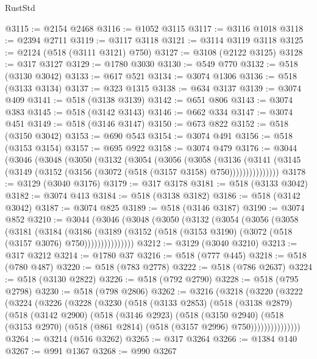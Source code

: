 \begin{lexlean}{RustStd}
\begin{coremodule}
@3115 := @2154 @2468
@3116 := @1052 @3115
@3117 := @3116 @1018
@3118 := @2394 @2711
@3119 := @3117 @3118
@3121 := @3114 @3119 @3118
@3125 := @2124 (@518 (@3111 @3121) @750)
@3127 := @3108 (@2122 @3125)
@3128 := @317 @3127
@3129 := @1780 @3030
@3130 := @549 @770
@3132 := @518 (@3130 @3042)
@3133 := @617 @521
@3134 := @3074 @1306
@3136 := @518 (@3133 @3134)
@3137 := @323 @1315
@3138 := @634 @3137
@3139 := @3074 @409
@3141 := @518 (@3138 @3139)
@3142 := @651 @806
@3143 := @3074 @383
@3145 := @518 (@3142 @3143)
@3146 := @662 @334
@3147 := @3074 @451
@3149 := @518 (@3146 @3147)
@3150 := @673 @822
@3152 := @518 (@3150 @3042)
@3153 := @690 @543
@3154 := @3074 @491
@3156 := @518 (@3153 @3154)
@3157 := @695 @922
@3158 := @3074 @479
@3176 := @3044
    (@3046
      (@3048
        (@3050
          (@3132
            (@3054
              (@3056
                (@3058
                  (@3136
                    (@3141
                      (@3145 (@3149 (@3152 (@3156 (@3072 (@518 (@3157 @3158) @750)))))))))))))))
@3178 := @3129 (@3040 @3176)
@3179 := @317 @3178
@3181 := @518 (@3133 @3042)
@3182 := @3074 @413
@3184 := @518 (@3138 @3182)
@3186 := @518 (@3142 @3042)
@3187 := @3074 @825
@3189 := @518 (@3146 @3187)
@3190 := @3074 @852
@3210 := @3044
    (@3046
      (@3048
        (@3050
          (@3132
            (@3054
              (@3056
                (@3058
                  (@3181
                    (@3184
                      (@3186
                        (@3189
                          (@3152 (@518 (@3153 @3190) (@3072 (@518 (@3157 @3076) @750)))))))))))))))
@3212 := @3129 (@3040 @3210)
@3213 := @317 @3212
@3214 := @1780 @37
@3216 := @518 (@777 @445)
@3218 := @518 (@780 @487)
@3220 := @518 (@783 @2778)
@3222 := @518 (@786 @2637)
@3224 := @518 (@3130 @2822)
@3226 := @518 (@792 @2790)
@3228 := @518 (@795 @2798)
@3230 := @518 (@798 @2806)
@3262 := @3216
    (@3218
      (@3220
        (@3222
          (@3224
            (@3226
              (@3228
                (@3230
                  (@518
                    (@3133 @2853)
                    (@518
                      (@3138 @2879)
                      (@518
                        (@3142 @2900)
                        (@518
                          (@3146 @2923)
                          (@518
                            (@3150 @2940)
                            (@518
                              (@3153 @2970)
                              (@518 (@861 @2814) (@518 (@3157 @2996) @750)))))))))))))))
@3264 := @3214 (@516 @3262)
@3265 := @317 @3264
@3266 := @1384 @140
@3267 := @991 @1367
@3268 := @990 @3267

\end{coremodule}
\end{lexlean}
